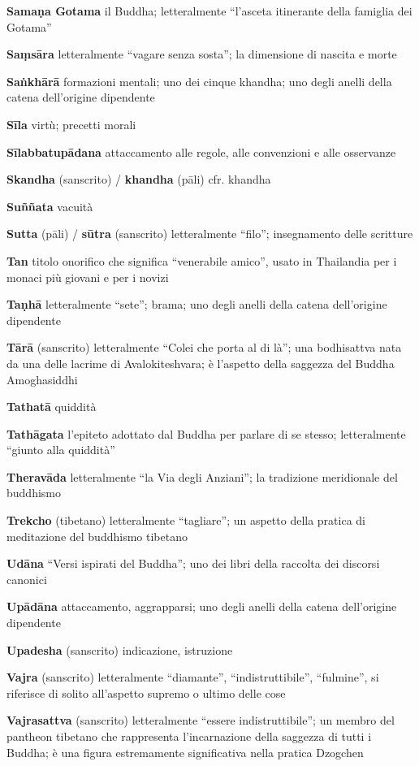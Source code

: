 \textbf{Samaṇa Gotama }il Buddha; letteralmente ``l'asceta itinerante della famiglia dei Gotama''

\textbf{Saṃsāra }letteralmente ``vagare senza sosta''; la dimensione di nascita e morte

\textbf{Sa}\textbf{ṅ}\textbf{khārā }formazioni mentali; uno dei cinque khandha; uno degli anelli della catena dell'origine dipendente

\textbf{Sīla }virtù; precetti morali

\textbf{Sīlabbatupādana }attaccamento alle regole, alle convenzioni e alle osservanze

\textbf{Skandha} (sanscrito) / \textbf{khandha} (pāli) cfr. khandha

\textbf{Suññata }vacuità

\textbf{Sutta} (pāli) / \textbf{sūtra} (sanscrito) letteralmente ``filo''; insegnamento delle scritture

\textbf{Tan }titolo onorifico che significa ``venerabile amico'', usato in Thailandia per i monaci più giovani e per i novizi

\textbf{Taṇhā }letteralmente ``sete''; brama; uno degli anelli della catena dell'origine dipendente

\textbf{Tārā }(sanscrito) letteralmente ``Colei che porta al di là''; una bodhisattva nata da una delle lacrime di Avalokiteshvara; è l'aspetto della saggezza del Buddha Amoghasiddhi

\textbf{Tathatā }quiddità

\textbf{Tathāgata }l'epiteto adottato dal Buddha per parlare di se stesso; letteralmente ``giunto alla quiddità''

\textbf{Theravāda} letteralmente ``la Via degli Anziani''; la tradizione meridionale del buddhismo

\textbf{Trekcho} (tibetano) letteralmente ``tagliare''; un aspetto della pratica di meditazione del buddhismo tibetano

\textbf{Udāna} ``Versi ispirati del Buddha''; uno dei libri della raccolta dei discorsi canonici

\textbf{Upādāna }attaccamento, aggrapparsi; uno degli anelli della catena dell'origine dipendente

\textbf{Upadesha} (sanscrito) indicazione, istruzione

\textbf{Vajra} (sanscrito) letteralmente ``diamante'', ``indistruttibile'', ``fulmine'', si riferisce di solito all'aspetto supremo o ultimo delle cose

\textbf{Vajrasattva} (sanscrito) letteralmente ``essere indistruttibile''; un membro del pantheon tibetano che rappresenta l'incarnazione della saggezza di tutti i Buddha; è una figura estremamente significativa nella pratica Dzogchen

